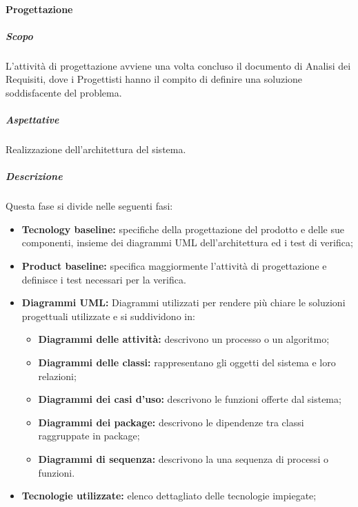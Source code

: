 			\paragraph {Progettazione}
				\subparagraph{Scopo}
					L'attività di progettazione avviene una volta concluso il documento di Analisi dei Requisiti, dove i Progettisti hanno il compito di definire una soluzione soddisfacente del problema.
				\subparagraph{Aspettative}
					Realizzazione dell'architettura del sistema.
				\subparagraph{Descrizione}
					Questa fase si divide nelle seguenti fasi: 
					\begin{itemize}
						\item \textbf{Tecnology baseline:} specifiche della progettazione del prodotto e delle sue componenti, insieme dei diagrammi UML dell'architettura ed i test di verifica;
						\item \textbf{Product baseline:} specifica maggiormente l'attività di progettazione e definisce i test necessari per la verifica. 
						\item \textbf{Diagrammi UML:} Diagrammi utilizzati per rendere più chiare le soluzioni progettuali utilizzate e si suddividono in:	
						\begin{itemize}
							\item \textbf{Diagrammi delle attività:} descrivono un processo o un algoritmo;
							\item \textbf{Diagrammi delle classi:} rappresentano gli oggetti del sistema e loro relazioni;
							\item \textbf{Diagrammi dei casi d'uso:} descrivono le funzioni offerte dal sistema;
							\item \textbf{Diagrammi dei package:} descrivono le dipendenze tra classi raggruppate in package;
							\item \textbf{Diagrammi di sequenza:} descrivono la una sequenza di processi o funzioni.
						\end{itemize}
						\item \textbf{Tecnologie utilizzate:} elenco dettagliato delle tecnologie impiegate; 
						\end{itemize}	
				
